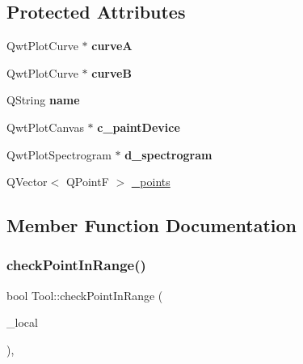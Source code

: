 \subsection*{Protected Attributes}
\begin{DoxyCompactItemize}
\item 
\mbox{\label{classCrossPointerTool_a461e7131fedd8d680870fb2f9a0a58a6}} 
Qwt\+Plot\+Curve $\ast$ {\bfseries curveA}
\item 
\mbox{\label{classCrossPointerTool_aadcce371c379f5fccf1bf43d59e22765}} 
Qwt\+Plot\+Curve $\ast$ {\bfseries curveB}
\item 
\mbox{\label{classTool_af0935d8e8edd73d8ec85424b5b15196b}} 
Q\+String {\bfseries name}
\item 
\mbox{\label{classTool_a1e301a03c5806c900786760d80049380}} 
Qwt\+Plot\+Canvas $\ast$ {\bfseries c\+\_\+paint\+Device}
\item 
\mbox{\label{classTool_af1d11cc5374ba7eb7c1d41cfb5d4e981}} 
Qwt\+Plot\+Spectrogram $\ast$ {\bfseries d\+\_\+spectrogram}
\item 
Q\+Vector$<$ Q\+PointF $>$ \mbox{\hyperlink{classTool_a68be77a2e364a7b13d7206388ba5843e}{\+\_\+points}}
\end{DoxyCompactItemize}


\subsection{Member Function Documentation}
\mbox{\label{classTool_a81244366dc1b9f55465ed6f37b81033c}} 
\subsubsection{\texorpdfstring{check\+Point\+In\+Range()}{checkPointInRange()}}
{\footnotesize\ttfamily bool Tool\+::check\+Point\+In\+Range (\begin{DoxyParamCaption}\item[{const Q\+PointF \&}]{\+\_\+local }\end{DoxyParamCaption})\hspace{0.3cm}{\ttfamily [protected]}, {\ttfamily [inherited]}}

